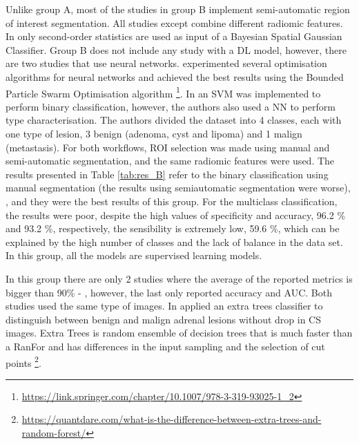 \documentclass{article}
\begin{document}
Unlike group A, most of the studies in group B implement semi-automatic region
of interest segmentation. All studies except \cite{Li2019} combine different
radiomic features. In \cite{Li2019} only second-order statistics are used as
input of a Bayesian Spatial Gaussian Classifier. Group B does not include any
study with a DL model, however, there are two studies that use neural networks.
\cite{Koyuncu2019} experimented several optimisation algorithms for neural
networks and achieved the best results using the Bounded Particle Swarm
Optimisation algorithm \footnote{\href{https://link.springer.com/chapter/10.1007/978-3-319-93025-1\_2}{https://link.springer.com/chapter/10.1007/978-3-319-93025-1\_2}}. In
\cite{Barstugan2020} an SVM was implemented to perform binary classification,
however, the authors also used a NN to perform type characterisation. The
authors divided the dataset into 4 classes, each with one type of lesion, 3
benign (adenoma, cyst and lipoma) and 1 malign (metastasis). For both workflows,
ROI selection was made using manual and semi-automatic segmentation, and the
same radiomic features were used. The results presented in Table \ref{tab:res_B}
refer to the binary classification using manual segmentation (the results using semiautomatic segmentation were worse), , and they were the best results of this
group. For the multiclass classification, the results were poor, despite the
high values of specificity and accuracy, 96.2 \% and 93.2 \%, respectively, the
sensibility is extremely low, 59.6 \%, which can be explained by the high number
of classes and the lack of balance in the data set. In this group, all the
models are supervised learning models.

In this group there are only 2 studies where the average of the reported metrics
is bigger than 90\% - \cite{Barstugan2020,Stanzione2021}, however, the last only
reported accuracy and AUC. Both studies used the same type of images. In
\cite{Stanzione2021} applied an extra trees classifier to distinguish between
benign and malign adrenal lesions without drop in CS images. Extra Trees is
random ensemble of decision trees that is much faster than a RanFor and has
differences in the input sampling and the selection of cut points \footnote{\href{https://quantdare.com/what-is-the-difference-between-extra-trees-and-random-forest/}{https://quantdare.com/what-is-the-difference-between-extra-trees-and-random-forest/}}.
\end{document}
